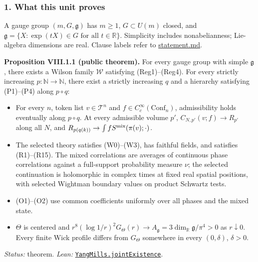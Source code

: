 \documentclass[
  letterpaper,
  11pt]{article}
\providecommand{\tightlist}{%
  \setlength{\itemsep}{0pt}\setlength{\parskip}{0pt}}
\begin{document}
\subsubsection{1. What this unit proves}\label{what-this-unit-proves-31}

A gauge group \((m,G,\mathfrak g)\) has \(m\ge1\), \(G\subset U(m)\)
closed, and
\(\mathfrak g=\{X:\exp(tX)\in G\text{ for all }t\in\mathbb R\}\).
Simplicity includes nonabelianness; Lie-algebra dimensions are real.
Clause labels refer to
\href{https://github.com/scottnarmstrong/yang-mills-informalization/blob/main/statement.md}{statement.md}.

\textbf{Proposition VIII.1.1 (public theorem).} For every gauge group
with simple \(\mathfrak g\), there exists a Wilson family \(\mathcal W\)
satisfying (Reg1)--(Reg4). For every strictly increasing
\(p:\mathbb N\to\mathbb N\), there exist a strictly increasing \(q\) and
a hierarchy satisfying (P1)--(P4) along \(p\circ q\):

\begin{itemize}
\tightlist
\item
  For every \(n\), token list \(v\in\mathcal T^n\) and
  \(f\in C_c^\infty(\mathrm{Conf}_n)\), admissibility holds eventually
  along \(p\circ q\). At every admissible volume \(p'\),
  \(C_{N,p'}(v;f)\to R_{p'}\) along all \(N\), and
  \(R_{p(q(k))}\to\int fS^{\rm mix}(\pi(v);\cdot)\).
\item
  The selected theory satisfies (W0)--(W3), has faithful fields, and
  satisfies (R1)--(R15). The mixed correlations are averages of
  continuous phase correlations against a full-support probability
  measure \(\nu\); the selected continuation is holomorphic in complex
  times at fixed real spatial positions, with selected Wightman boundary
  values on product Schwartz tests.
\item
  (O1)--(O2) use common coefficients uniformly over all phases and the
  mixed state.
\item
  \(\Theta\) is centered and
  \(r^8(\log1/r)^2G_\Theta(r)\to A_{\mathfrak g}=3\dim_{\mathbb R}\mathfrak g/\pi^4>0\)
  as \(r\downarrow0\). Every finite Wick profile differs from
  \(G_\Theta\) somewhere in every \((0,\delta)\), \(\delta>0\).
\end{itemize}

\emph{Status:} theorem. \emph{Lean:}
\href{https://github.com/yang-mills-group/OpenAI-YM-20261028/blob/3456e5e75cf8d4cd558955a5c7638fba2d68f464/Solution.lean\#L4-L10}{\texttt{YangMills.jointExistence}}.
\end{document}
